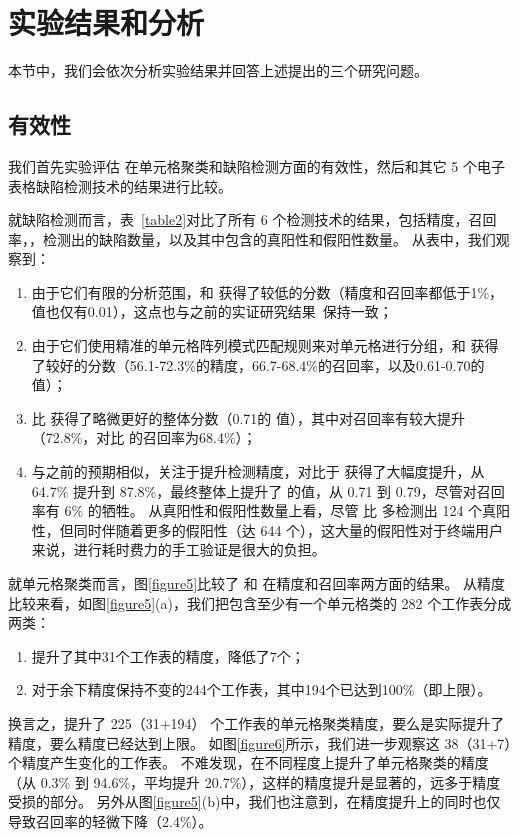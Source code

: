 \section{实验结果和分析}
本节中，我们会依次分析实验结果并回答上述提出的三个研究问题。

\subsection{有效性}
我们首先实验评估 \wa 在单元格聚类和缺陷检测方面的有效性，然后和其它 5 个电子表格缺陷检测技术的结果进行比较。


就缺陷检测而言，表~\ref{table2}对比了所有 6 个检测技术的结果，包括精度，召回率，\fmd，检测出的缺陷数量，以及其中包含的真阳性和假阳性数量。
从表中，我们观察到：
\begin{enumerate}
    \item 由于它们有限的分析范围，\uc 和 \di 获得了较低的分数（精度和召回率都低于1\%，\fmd 值也仅有0.01），这点也与之前的实证研究结果~\cite{zhang2017effectively}保持一致；
    \item 由于它们使用精准的单元格阵列模式匹配规则来对单元格进行分组，\am 和 \ca 获得了较好的分数（56.1-72.3\%的精度，66.7-68.4\%的召回率，以及0.61-0.70的\fmd 值）；
    \item \cu 比 \ca 获得了略微更好的整体分数（0.71的 \fmd 值），其中对召回率有较大提升（72.8\%，对比 \ca 的召回率为68.4\%）；
    \item 与之前的预期相似，\wa 关注于提升检测精度，对比于 \cu 获得了大幅度提升，从64.7\% 提升到 87.8\%，最终整体上提升了 \fmd 的值，从 0.71 到 0.79，尽管对召回率有 6\% 的牺牲。
    从真阳性和假阳性数量上看，尽管 \cu 比 \wa 多检测出 124 个真阳性，但同时伴随着更多的假阳性（达 644 个），这大量的假阳性对于终端用户来说，进行耗时费力的手工验证是很大的负担。
\end{enumerate}


就单元格聚类而言，图\ref{figure5}比较了 \cu 和 \wa 在精度和召回率两方面的结果。
从精度比较来看，如图\ref{figure5}(a)，我们把包含至少有一个单元格类的 282 个工作表分成两类：
\begin{enumerate}
    \item \wa 提升了其中31个工作表的精度，降低了7个；
    \item 对于余下精度保持不变的244个工作表，其中194个已达到100\%（即上限）。
\end{enumerate}

换言之，\wa 提升了 225（31+194） 个工作表的单元格聚类精度，要么是实际提升了精度，要么精度已经达到上限。
如图\ref{figure6}所示，我们进一步观察这 38（31+7）个精度产生变化的工作表。
不难发现，\wa 在不同程度上提升了单元格聚类的精度（从 0.3\% 到 94.6\%，平均提升 20.7\%），这样的精度提升是显著的，远多于精度受损的部分。
另外从图\ref{figure5}(b)中，我们也注意到，\wa 在精度提升上的同时也仅导致召回率的轻微下降（2.4\%）。



